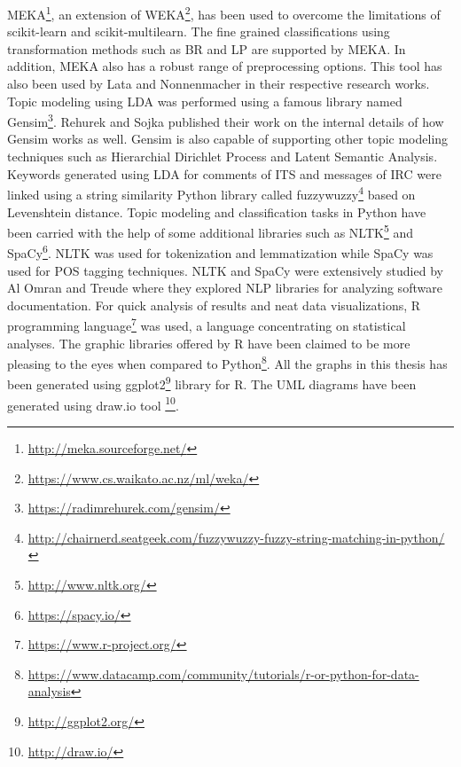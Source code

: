 \documentclass[a4paper,12pt,twoside]{report}
\begin{document}
\newline \newline
MEKA\footnote{\url{http://meka.sourceforge.net/}}\cite{MEKA2016}, an extension of WEKA\footnote{\url{https://www.cs.waikato.ac.nz/ml/weka/}}, has been used to overcome the limitations of scikit-learn and scikit-multilearn. The fine grained classifications using transformation methods such as BR and LP are supported by MEKA. In addition, MEKA also has a robust range of preprocessing options. This tool has also been used by Lata \cite{Lata2016} and Nonnenmacher \cite{Nonnenmacher2017} in their respective research works.
\newline \newline
Topic modeling using LDA was performed using a famous library named Gensim\footnote{\url{https://radimrehurek.com/gensim/}}. Rehurek and Sojka \cite{Rehurek2010} published their work on the internal details of how Gensim works as well. Gensim is also capable of supporting other topic modeling techniques such as Hierarchial Dirichlet Process and Latent Semantic Analysis. Keywords generated using LDA for comments of ITS and messages of IRC were linked using a string similarity Python library called fuzzywuzzy\footnote{\url{http://chairnerd.seatgeek.com/fuzzywuzzy-fuzzy-string-matching-in-python/}} based on Levenshtein distance.
\newline \newline
Topic modeling and classification tasks in Python have been carried with the help of some additional libraries such as NLTK\footnote{\url{http://www.nltk.org/}} and SpaCy\footnote{\url{https://spacy.io/}}. NLTK was used for tokenization and lemmatization while SpaCy was used for POS tagging techniques. NLTK and SpaCy were extensively studied by Al Omran and Treude \cite{AlOmran2017} where they explored NLP libraries for analyzing software documentation. 
\newline \newline
For quick analysis of results and neat data visualizations, R programming language\footnote{\url{https://www.r-project.org/}} was used, a language concentrating on statistical analyses. The graphic libraries offered by R have been claimed to be more pleasing to the eyes when compared to Python\footnote{\url{https://www.datacamp.com/community/tutorials/r-or-python-for-data-analysis}}. All the graphs in this thesis has been generated using ggplot2\footnote{\url{http://ggplot2.org/}} library for R. The UML diagrams have been generated using draw.io tool \footnote{\url{http://draw.io/}}.
\end{document}
